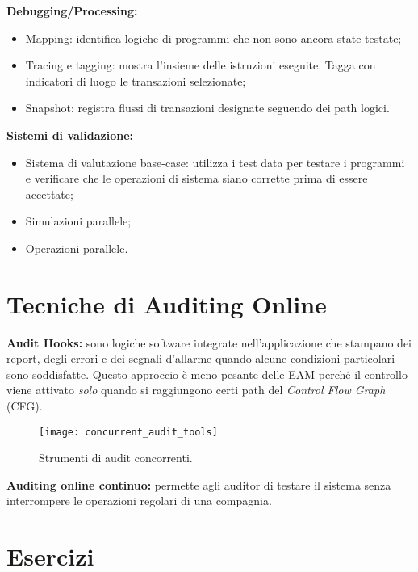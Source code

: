 \textbf{Debugging/Processing:}

\begin{itemize}
    \item Mapping: identifica logiche di programmi che non
    sono ancora state testate;
    \item Tracing e tagging: mostra l'insieme delle istruzioni eseguite. Tagga
    con indicatori di luogo le
    transazioni selezionate;
    \item Snapshot: registra flussi di transazioni designate seguendo dei path
    logici.
\end{itemize}

\textbf{Sistemi di validazione:}

\begin{itemize}
    \item Sistema di valutazione base-case: utilizza i test data per testare i
    programmi e verificare che
    le operazioni di sistema siano corrette prima di essere accettate;
    \item Simulazioni parallele;
    \item Operazioni parallele.
\end{itemize}

\section{Tecniche di Auditing Online}

\textbf{Audit Hooks:} sono logiche software integrate nell'applicazione
che stampano dei report, degli errori e dei segnali d'allarme
quando alcune condizioni particolari sono soddisfatte.
Questo approccio è meno pesante delle EAM perché il controllo
viene attivato \emph{solo} quando si raggiungono certi path
del \textit{Control Flow Graph} (CFG).

\begin{figure}[h!]
        \begin{center}
                \texttt{[image: concurrent\_audit\_tools]}
        \end{center}
        \caption{Strumenti di audit concorrenti.}
        \label{fig:concurrent:audit:tools}
\end{figure}

\noindent \textbf{Auditing online continuo:} permette agli auditor di
testare il sistema senza interrompere le operazioni regolari di una
compagnia.

\section{Esercizi}

